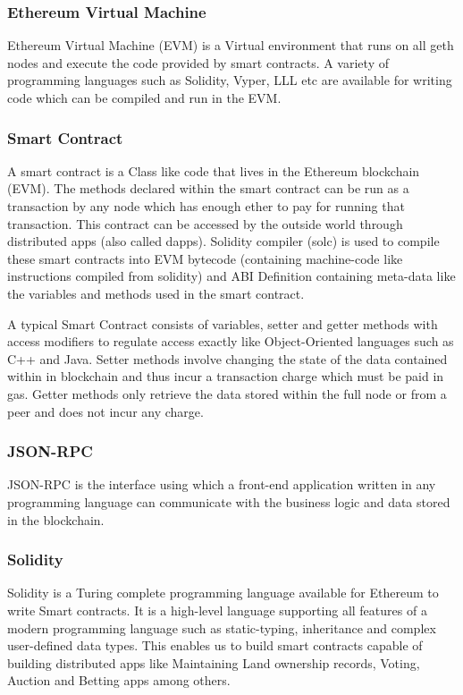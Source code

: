 \documentclass[11pt,openright]{report}
\begin{document}
\subsubsection{Ethereum Virtual Machine}
Ethereum Virtual Machine (EVM) is a Virtual environment that runs on all geth nodes and execute the code provided by smart contracts. A variety of programming languages such as Solidity, Vyper, LLL etc are available for writing code which can be compiled and run in the EVM.

\subsubsection{Smart Contract}
A smart contract is a Class like code that lives in the Ethereum blockchain (EVM). The methods declared within the smart contract can be run as a transaction by any node which has enough ether to pay for running that transaction. This contract can be accessed by the outside world through distributed apps (also called dapps). Solidity compiler (solc) is used to compile these smart contracts into EVM bytecode (containing machine-code like instructions compiled from solidity) and ABI Definition containing meta-data like the variables and methods used in the smart contract. 

A typical Smart Contract consists of variables, setter and getter methods with access modifiers to regulate access exactly like Object-Oriented languages such as C++ and Java. Setter methods involve changing the state of the data contained within in blockchain and thus incur a transaction charge which must be paid in gas. Getter methods only retrieve the data stored within the full node or from a peer and does not incur any charge.

\subsubsection{JSON-RPC}
JSON-RPC is the interface using which a front-end application written in any programming language can communicate with the business logic and data stored in the blockchain.

\subsubsection{Solidity}
Solidity is a Turing complete programming language available for Ethereum to write Smart contracts. It is a high-level language supporting all features of a modern programming language such as static-typing, inheritance and complex user-defined data types. This enables us to build smart contracts capable of building distributed apps like Maintaining Land ownership records, Voting, Auction and Betting apps among others.
\end{document}

